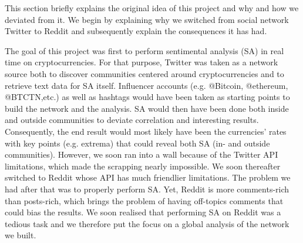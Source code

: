 This section briefly explains the original idea of this project and why and how we deviated from it. We begin by explaining why we switched from social network Twitter to Reddit and subsequently explain the consequences it has had.

The goal of this project was first to perform sentimental analysis (SA) in real time on cryptocurrencies. For that purpose, Twitter was taken as a network source both to discover communities centered around cryptocurrencies and to retrieve text data for SA itself. Influencer accounts (e.g. @Bitcoin, @ethereum, @BTCTN,etc.) as well as hashtags would have been taken as starting points to build the network and the analysis. SA would then have been done both inside and outside communities to deviate correlation and interesting results. Consequently, the end result would most likely have been the currencies' rates with key points (e.g. extrema) that could reveal both SA (in- and outside communities). However, we soon ran into a wall because of the Twitter API limitations, which made the scrapping nearly impossible. We soon thereafter switched to Reddit whose API has much friendlier limitations. The problem we had after that was to properly perform SA. Yet, Reddit is more comments-rich than posts-rich, which brings the problem of having off-topics comments that could bias the results. We soon realised that performing SA on Reddit was a tedious task and we therefore put the focus on a global analysis of the network we built.
